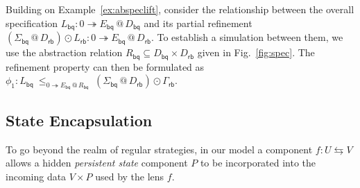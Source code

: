 \documentclass[acmsmall,nonacm]{acmart}
\newcommand{\kw}[1]{\ensuremath{ \mathsf{#1} }}
\newcommand{\emptysig}{0}
\begin{document}
\begin{example} \label{ex:bqcorrect} %
Building on Example~\ref{ex:abspeclift},
consider the relationship between
the overall specification $
  L_\kw{bq} :
    \emptysig \twoheadrightarrow E_\kw{bq} \mathbin@ D_\kw{bq}
$
and its partial refinement
$
  (\Sigma_\kw{bq} \mathbin@ D_\kw{rb}) \odot L_\kw{rb} :
    \emptysig \twoheadrightarrow E_\kw{bq} \mathbin@ D_\kw{rb}
$.
To establish a simulation between them,
we use the abstraction relation
$R_\kw{bq} \subseteq D_\kw{bq} \times D_\kw{rb}$
given in Fig.~\ref{fig:spec}.
The refinement property can then be formulated as
$
  \phi_1 :
  L_\kw{bq}
  \:\le_{\emptysig \twoheadrightarrow E_\kw{bq} \mathbin@ R_\kw{bq}}\:
  (\Sigma_\kw{bq} \mathbin@ D_\kw{rb}) \odot
  \Gamma_\kw{rb}
$.
\end{example}

\subsection{State Encapsulation}
\label{sec:state:encap}

To go beyond the realm of regular strategies,
in our model a component $f : U \leftrightarrows V$
allows a hidden \emph{persistent state} component $P$
to be incorporated into the incoming data $V \times P$
used by the lens $f$.
\end{document}
